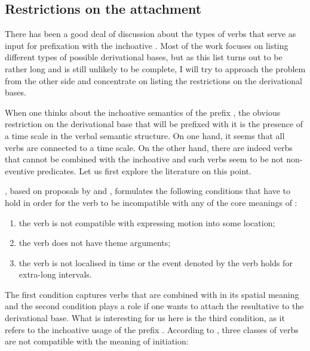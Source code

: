 \subsection{Restrictions on the attachment}
There has been a good deal of discussion about the types of verbs that serve as input for prefixation with the inchoative  \citep{Isachenko:60, Zemskaja:55, Sheljakin:69, Zaliznjak:95, Braginsky:08}. Most of the work focuses on listing different types of possible derivational bases, but as this list turns out to be rather long and is still unlikely to be complete, I will try to approach the problem from the other side and concentrate on listing the restrictions on the derivational bases.

When one thinks about the inchoative semantics of the prefix , the obvious restriction on the derivational base that will be prefixed with it is the presence of a time scale in the verbal semantic structure. On one hand, it seems that all verbs are connected to a time scale. On the other hand, there are indeed verbs that cannot be combined with the inchoative  and such verbs seem to be not non-eventive predicates. Let us first explore the literature on this point.

\citet[275]{Braginsky:08}, based on proposals by \citet{Sheljakin:69} and \citet{Paducheva:96}, formulates the following conditions that have to hold in order for the verb to be incompatible with any of the core meanings of :
\begin{enumerate}
\item the verb is not compatible with expressing motion into some location;
\item the verb does not have theme arguments;
\item the verb is not localised in time or the event denoted by the verb holds for extra-long intervals.
\end{enumerate}

The first condition captures verbs that are combined with  in its spatial meaning and the second condition plays a role if one wants to attach the resultative  to the derivational base. What is interesting for us here is the third condition, as it refers to the inchoative usage of the prefix . According to \citet{Paducheva:96}, three classes of verbs are not compatible with the meaning of initiation:

